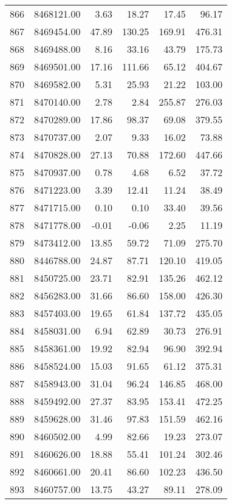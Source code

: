 \begin{table}[ht]
\begin{tabular}{rrrrrr}
  866 & 8468121.00 & 3.63 & 18.27 & 17.45 & 96.17 \\ 
  867 & 8469454.00 & 47.89 & 130.25 & 169.91 & 476.31 \\ 
  868 & 8469488.00 & 8.16 & 33.16 & 43.79 & 175.73 \\ 
  869 & 8469501.00 & 17.16 & 111.66 & 65.12 & 404.67 \\ 
  870 & 8469582.00 & 5.31 & 25.93 & 21.22 & 103.00 \\ 
  871 & 8470140.00 & 2.78 & 2.84 & 255.87 & 276.03 \\ 
  872 & 8470289.00 & 17.86 & 98.37 & 69.08 & 379.55 \\ 
  873 & 8470737.00 & 2.07 & 9.33 & 16.02 & 73.88 \\ 
  874 & 8470828.00 & 27.13 & 70.88 & 172.60 & 447.66 \\ 
  875 & 8470937.00 & 0.78 & 4.68 & 6.52 & 37.72 \\ 
  876 & 8471223.00 & 3.39 & 12.41 & 11.24 & 38.49 \\ 
  877 & 8471715.00 & 0.10 & 0.10 & 33.40 & 39.56 \\ 
  878 & 8471778.00 & -0.01 & -0.06 & 2.25 & 11.19 \\ 
  879 & 8473412.00 & 13.85 & 59.72 & 71.09 & 275.70 \\ 
  880 & 8446788.00 & 24.87 & 87.71 & 120.10 & 419.05 \\ 
  881 & 8450725.00 & 23.71 & 82.91 & 135.26 & 462.12 \\ 
  882 & 8456283.00 & 31.66 & 86.60 & 158.00 & 426.30 \\ 
  883 & 8457403.00 & 19.65 & 61.84 & 137.72 & 435.05 \\ 
  884 & 8458031.00 & 6.94 & 62.89 & 30.73 & 276.91 \\ 
  885 & 8458361.00 & 19.92 & 82.94 & 96.90 & 392.94 \\ 
  886 & 8458524.00 & 15.03 & 91.65 & 61.12 & 375.31 \\ 
  887 & 8458943.00 & 31.04 & 96.24 & 146.85 & 468.00 \\ 
  888 & 8459492.00 & 27.37 & 83.95 & 153.41 & 472.25 \\ 
  889 & 8459628.00 & 31.46 & 97.83 & 151.59 & 462.16 \\ 
  890 & 8460502.00 & 4.99 & 82.66 & 19.23 & 273.07 \\ 
  891 & 8460626.00 & 18.88 & 55.41 & 101.24 & 302.46 \\ 
  892 & 8460661.00 & 20.41 & 86.60 & 102.23 & 436.50 \\ 
  893 & 8460757.00 & 13.75 & 43.27 & 89.11 & 278.09 \\ 

\end{tabular}
\end{table}
